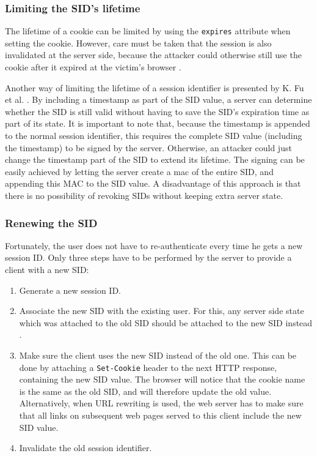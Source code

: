 \subsubsection{Limiting the SID's lifetime}\label{limiting-lifetime}
The lifetime of a cookie can be limited by using the \texttt{expires} attribute when setting the cookie. However, care must be taken that the session is also invalidated at the server side, because the attacker could otherwise still use the cookie after it expired at the victim's browser \cite{Kolsek2002}.

Another way of limiting the lifetime of a session identifier is presented by K. Fu et al. \cite{Fu2001}. By including a timestamp as part of the SID value, a server can determine whether the SID is still valid without having to save the SID's expiration time as part of its state. It is important to note that, because the timestamp is appended to the normal session identifier, this requires the complete SID value (including the timestamp) to be signed by the server. Otherwise, an attacker could just change the timestamp part of the SID to extend its lifetime. The signing can be easily achieved by letting the server create a \gls{mac} of the entire SID, and appending this MAC to the SID value. A disadvantage of this approach is that there is no possibility of revoking SIDs without keeping extra server state.

\subsubsection{Renewing the SID}\label{renewing-sid}
Fortunately, the user does not have to re-authenticate every time he gets a new session ID. Only three steps have to be performed by the server to provide a client with a new SID:
\begin{enumerate}
	\item Generate a new session ID.
	\item Associate the new SID with the existing user. For this, any server side state which was attached to the old SID should be attached to the new SID instead \cite{Wasser2007}.
	\item Make sure the client uses the new SID instead of the old one. This can be done by attaching a \texttt{Set-Cookie} header to the next HTTP response, containing the new SID value. The browser will notice that the cookie name is the same as the old SID, and will therefore update the old value. Alternatively, when URL rewriting is used, the web server has to make sure that all links on subsequent web pages served to this client include the new SID value.
	\item Invalidate the old session identifier.
\end{enumerate}

